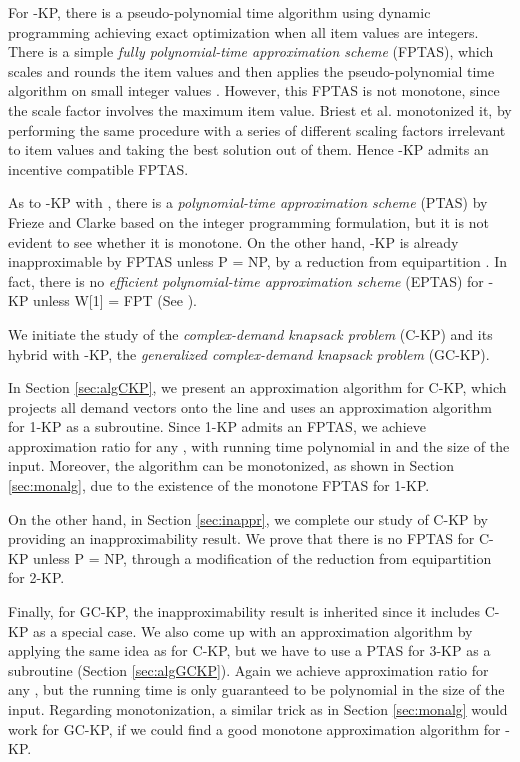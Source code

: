 \documentclass{aamas2013}
\begin{document}
For {-KP}, there is a pseudo-polynomial time algorithm using dynamic programming achieving exact optimization when all item values are integers.  There is a simple {\em fully polynomial-time approximation scheme} (FPTAS), which scales and rounds the item values and then applies the pseudo-polynomial time algorithm on small integer values \cite{KPP10book}.  However, this FPTAS is not monotone, since the scale factor involves the maximum item value.  Briest et al. \cite{BKV05KS} monotonized it, by performing the same procedure with a series of different scaling factors irrelevant to item values and taking the best solution out of them.  Hence {-KP} admits an incentive compatible FPTAS.       

As to {\sc -KP} with , there is a {\em polynomial-time approximation scheme} (PTAS) by Frieze and Clarke \cite{FC84alg} based on the integer programming formulation, but it is not evident to see whether it is monotone.  On the other hand, {-KP} is already inapproximable by FPTAS unless P = NP, by a reduction from {\sc equipartition} \cite{KPP10book}.  In fact, there is no {\em efficient polynomial-time approximation scheme} (EPTAS) for {-KP} unless W[1] = FPT (See \cite{kulik2010there}).
 
\smallskip

We initiate the study of the {\em complex-demand knapsack problem} ({\sc C-KP}) and its hybrid with {-KP}, the {\em generalized complex-demand knapsack problem} ({\sc GC-KP}).

In Section \ref{sec:algCKP}, we present an approximation algorithm for C-KP, which projects all demand vectors onto the  line and uses an approximation algorithm for 1-KP as a subroutine.  Since 1-KP admits an FPTAS, we achieve approximation ratio  for any , with running time polynomial in  and the size of the input.  Moreover, the algorithm can be monotonized, as shown in Section \ref{sec:monalg}, due to the existence of the monotone FPTAS for 1-KP.  


On the other hand, in Section \ref{sec:inappr}, we complete our study of C-KP by providing an inapproximability result.  We prove that there is no FPTAS for C-KP unless P = NP, through a modification of the reduction from {\sc equipartition} for 2-KP.  

Finally, for GC-KP, the inapproximability result is inherited since it includes C-KP as a special case.  We also come up with an approximation algorithm by applying the same idea as for C-KP, but we have to use a PTAS for 3-KP as a subroutine (Section \ref{sec:algGCKP}). Again we achieve approximation ratio  for any , but the running time is only guaranteed to be polynomial in the size of the input.   
Regarding monotonization, a similar trick as in Section \ref{sec:monalg} would work for {\sc GC-KP}, if we could find a good monotone approximation algorithm for {-KP}.
\end{document}
